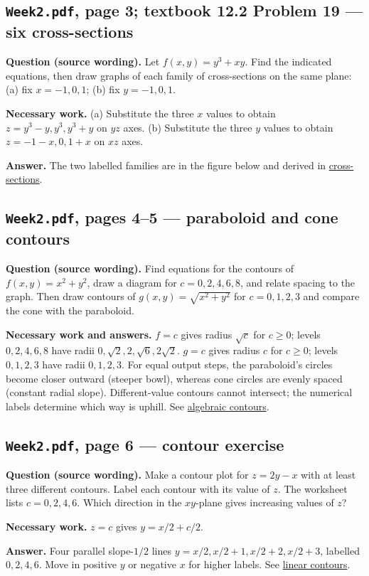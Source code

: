 \subsection{\texttt{Week2.pdf}, page 3; textbook 12.2 Problem 19 --- six cross-sections}
\textbf{Question (source wording).} Let $f(x,y)=y^3+xy$. Find the indicated equations, then draw graphs of each family of cross-sections on the same plane: (a) fix $x=-1,0,1$; (b) fix $y=-1,0,1$.\par
\textbf{Necessary work.} (a) Substitute the three $x$ values to obtain $z=y^3-y,y^3,y^3+y$ on $yz$ axes. (b) Substitute the three $y$ values to obtain $z=-1-x,0,1+x$ on $xz$ axes.\par
\textbf{Answer.} The two labelled families are in the figure below and derived in \hyperref[cross]{cross-sections}.

\subsection{\texttt{Week2.pdf}, pages 4--5 --- paraboloid and cone contours}
\textbf{Question (source wording).} Find equations for the contours of $f(x,y)=x^2+y^2$, draw a diagram for $c=0,2,4,6,8$, and relate spacing to the graph. Then draw contours of $g(x,y)=\sqrt{x^2+y^2}$ for $c=0,1,2,3$ and compare the cone with the paraboloid.\par
\textbf{Necessary work and answers.} $f=c$ gives radius $\sqrt c$ for $c\geq0$; levels $0,2,4,6,8$ have radii $0,\sqrt2,2,\sqrt6,2\sqrt2$. $g=c$ gives radius $c$ for $c\geq0$; levels $0,1,2,3$ have radii $0,1,2,3$. For equal output steps, the paraboloid's circles become closer outward (steeper bowl), whereas cone circles are evenly spaced (constant radial slope). Different-value contours cannot intersect; the numerical labels determine which way is uphill. See \hyperref[radial]{algebraic contours}.

\subsection{\texttt{Week2.pdf}, page 6 --- contour exercise}
\textbf{Question (source wording).} Make a contour plot for $z=2y-x$ with at least three different contours. Label each contour with its value of $z$. The worksheet lists $c=0,2,4,6$. Which direction in the $xy$-plane gives increasing values of $z$?\par
\textbf{Necessary work.} $z=c$ gives $y=x/2+c/2$.\par
\textbf{Answer.} Four parallel slope-$1/2$ lines $y=x/2,x/2+1,x/2+2,x/2+3$, labelled $0,2,4,6$. Move in positive $y$ or negative $x$ for higher labels. See \hyperref[plane]{linear contours}.

